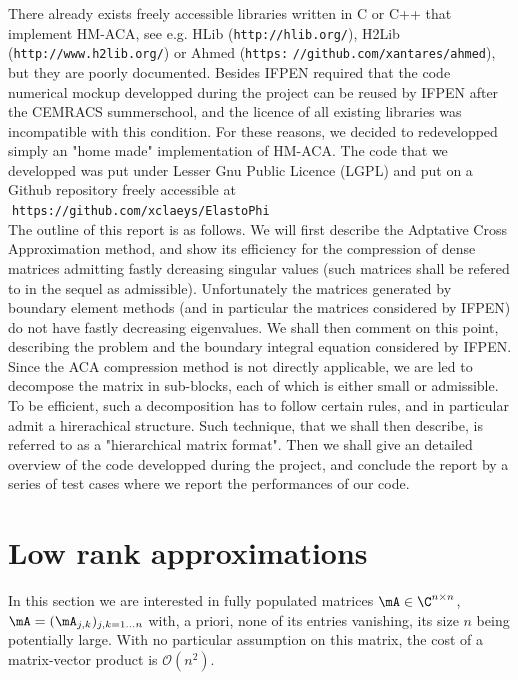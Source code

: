There already exists freely accessible libraries written in C or C++ that implement HM-ACA, see e.g. HLib (\verb?http://hlib.org/?), H2Lib 
(\verb?http://www.h2lib.org/?) or Ahmed (\verb?https:? \verb?//github.com/xantares/ahmed?),  but they are poorly documented. Besides IFPEN required 
that the code numerical mockup developped during the project can be reused by IFPEN after the CEMRACS summerschool, 
and the licence of all existing libraries was incompatible with this condition. For these reasons, we decided to redevelopped simply  
an "home made" implementation of HM-ACA. The code that we developped was put under Lesser Gnu Public Licence (LGPL) and 
put on a Github repository freely accessible at\\[10pt]
\textcolor{white}{.}\hspace{4cm}\verb?https://github.com/xclaeys/ElastoPhi?\\[10pt]
The outline of this report is as follows. We will first describe the Adptative Cross Approximation method, and show its efficiency 
for the compression of dense matrices admitting fastly dcreasing singular values (such matrices shall be refered to in the sequel as admissible). 
Unfortunately the matrices generated by boundary element  methods (and in particular the matrices considered by IFPEN) do not have 
fastly decreasing eigenvalues. We shall then comment on this point, describing the problem and the boundary integral equation 
considered by IFPEN. Since the ACA compression method is not directly applicable, we are led to decompose the matrix in sub-blocks, 
each of which is either small or admissible. To be efficient, such a decomposition has to follow certain rules, and in particular 
admit a hirerachical structure. Such technique, that we shall then describe, is referred to as a "hierarchical matrix format". 
Then we shall give an detailed overview of the code developped during the project, and conclude the report by a series of test 
cases where we report the performances of our code.

\section{Low rank approximations}\label{sec:LowRankApprox}

In this section we are interested in fully populated matrices $\mA\in \C^{n\times n}$, $\mA = (\mA_{j,k})_{j,k=1\dots n}$ with, a priori, 
none of its entries vanishing, its size $n$ being potentially large. With no particular assumption on this matrix, the cost of a 
matrix-vector product is $\mathcal{O}(n^{2})$. 

